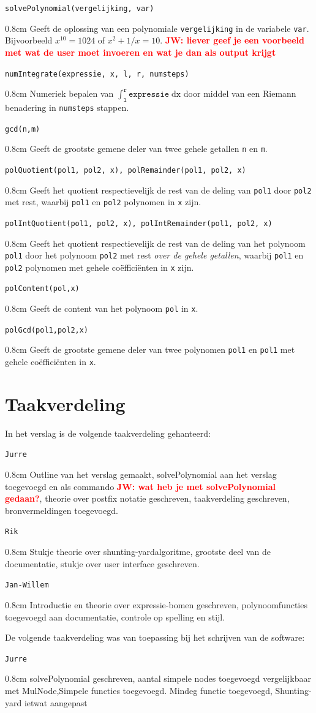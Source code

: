 \documentclass[a4paper]{article}
\newcommand{\rcom}[1]{\textbf{\textcolor{red}{#1}}}
\newcommand{\com}[2]{\texttt{#1}\mbox{}\vspace{-2ex}\begin{adjustwidth}{0.8cm}{} #2 \end{adjustwidth}}
\newcommand{\ttt}[1]{\texttt{#1}}
\begin{document}
\com{solvePolynomial(vergelijking, var)}{Geeft de oplossing van een polynomiale \ttt{vergelijking} in de variabele \ttt{var}. Bijvoorbeeld $x^{10} = 1024$ of $x^2 + 1/x = 10$. \rcom{JW: liever geef je een voorbeeld met wat de user moet invoeren en wat je dan als output krijgt} }
\com{numIntegrate(expressie, x, l, r, numsteps)}{Numeriek bepalen van $\int_{\texttt{l}}^\texttt{r} \texttt{expressie} \; \mathrm{d}\texttt{x}$ door middel van een Riemann benadering in \texttt{numsteps} stappen.}
\com{gcd(n,m)}{Geeft de grootste gemene deler van twee gehele getallen \texttt{n} en \texttt{m}.}
\com{polQuotient(pol1, pol2, x), polRemainder(pol1, pol2, x)}{Geeft het quotient respectievelijk de rest van de deling van \texttt{pol1} door \texttt{pol2} met rest, waarbij \texttt{pol1} en \texttt{pol2} polynomen in \texttt{x} zijn.}
\com{polIntQuotient(pol1, pol2, x), polIntRemainder(pol1, pol2, x)}{Geeft het quotient respectievelijk de rest van de deling van het polynoom \texttt{pol1} door het polynoom \texttt{pol2} met rest \textit{over de gehele getallen}, waarbij \texttt{pol1} en \texttt{pol2} polynomen met gehele co\"effici\"enten in \texttt{x} zijn.}
\com{polContent(pol,x)}{Geeft de content van het polynoom \texttt{pol} in \texttt{x}.}
\com{polGcd(pol1,pol2,x)}{Geeft de grootste gemene deler van twee polynomen \texttt{pol1} en \texttt{pol1} met gehele co\"effici\"enten in \texttt{x}.}


\section{Taakverdeling}
In het verslag is de volgende taakverdeling gehanteerd:

\com{Jurre} {Outline van het verslag gemaakt, solvePolynomial aan het verslag toegevoegd en als commando \rcom{JW: wat heb je met solvePolynomial gedaan?}, theorie over postfix notatie geschreven, taakverdeling geschreven, bronvermeldingen toegevoegd.}

\com{Rik} {Stukje theorie over shunting-yardalgoritme, grootste deel van de documentatie, stukje over user interface geschreven.}
\com{Jan-Willem} {Introductie en theorie over expressie-bomen geschreven, polynoomfuncties toegevoegd aan documentatie, controle op spelling en stijl.}

De volgende taakverdeling was van toepassing bij het schrijven van de software:

\com{Jurre} {solvePolynomial geschreven, aantal simpele nodes toegevoegd vergelijkbaar met MulNode,Simpele functies toegevoegd. Mindeg functie toegevoegd, Shunting-yard ietwat aangepast}
\end{document}

